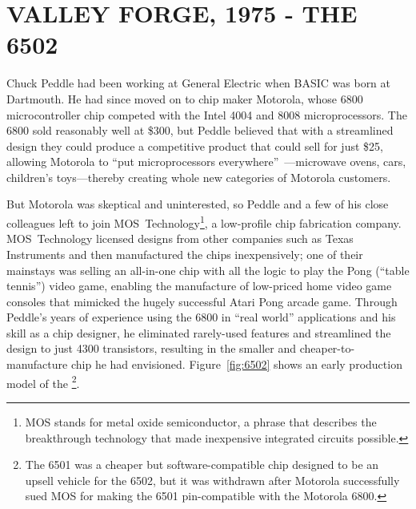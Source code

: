 
\section{VALLEY FORGE, 1975 - THE 6502}


Chuck Peddle had been working at General Electric when BASIC was
born at Dartmouth.  He had since moved on to chip maker Motorola, whose 6800
microcontroller chip competed with the Intel 4004 and
8008 microprocessors.  The 6800 sold reasonably well at \$300, but
Peddle  believed that with a streamlined design they could
produce a competitive product that could sell for just \$25,
allowing Motorola to ``put
microprocessors everywhere''~\cite[p. 31]{commodore}---microwave ovens,
cars, children's toys---thereby creating whole new categories of Motorola customers.

But Motorola was skeptical and uninterested, so Peddle and a few of his close
colleagues left to join MOS~Technology\footnote{MOS stands
  for metal oxide 
semiconductor, a phrase that describes the breakthrough technology that
made inexpensive integrated circuits possible.}, a low-profile chip
fabrication company.  MOS~Technology licensed designs from other
companies such as Texas Instruments and then 
manufactured the chips inexpensively; one of their mainstays was 
selling an all-in-one chip with all the logic to play the Pong (``table
tennis'') video game, enabling the manufacture of low-priced home video game
consoles that mimicked the hugely successful Atari Pong arcade game.
Through Peddle's years
of experience using the 6800 in ``real world'' applications and his
skill as a chip designer,
he eliminated rarely-used features and streamlined the design
to just 4300 transistors, resulting in the smaller and
cheaper-to-manufacture chip he had envisioned.  Figure~\ref{fig:6502}
shows an early production model of the \footnote{The 6501 was a 
  cheaper but software-compatible chip designed to be an upsell
  vehicle for the 6502, but it was withdrawn after Motorola successfully
  sued MOS for making the 6501 
  pin-compatible with the Motorola 6800.}.



